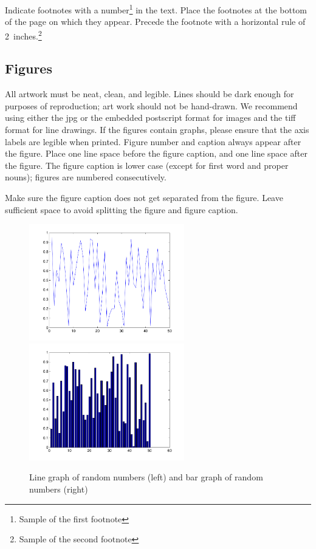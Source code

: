 \documentclass{article}
\begin{document}
Indicate footnotes with a number\footnote{Sample of the first
footnote} in the text. Place the footnotes at the bottom of the page
on which they appear. Precede the footnote with a horizontal rule of
2~inches.\footnote{Sample of the second footnote}

\subsection{Figures}

All artwork must be neat, clean, and legible. Lines should be dark
enough for purposes of reproduction; art work should not be
hand-drawn. We recommend using either the jpg or the embedded
postscript format for images and the tiff format for line drawings.
If the figures contain graphs, please ensure that the axis labels
are legible when printed. Figure number and caption always appear
after the figure. Place one line space before the figure caption,
and one line space after the figure. The figure caption is lower
case (except for first word and proper nouns); figures are numbered
consecutively.

Make sure the figure caption does not get separated from the figure.
Leave sufficient space to avoid splitting the figure and figure caption.

\begin{figure} [h]
    \centering
    \includegraphics[height=2.0in]{figs/g1.pdf}
    \hspace{.2in}
    \includegraphics[height=2.0in]{figs/g2.pdf}
    \caption{Line graph of random numbers (left) and bar graph of random numbers (right)}
    \label{fig:sampleFigure}
\end{figure}
\end{document}
